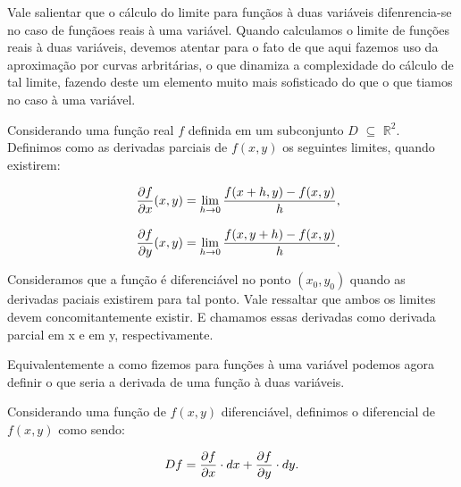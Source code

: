 \begin{definition}

    Vale salientar que o cálculo do limite para funçãos à duas variáveis
    difenrencia-se no caso de funçãoes reais à uma variável. Quando calculamos
    o limite de funções reais à duas variáveis, devemos atentar para o fato
    de que aqui fazemos uso da aproximação por curvas arbritárias, o que
    dinamiza a complexidade do cálculo de tal limite, fazendo deste um elemento
    muito mais sofisticado do que o que tiamos no caso à uma variável.

    Considerando uma função real $f$ definida em um subconjunto $D$ $\subseteq$ \(\mathbb{R}^2\). Definimos como as derivadas parciais de $f(x, y)$ os seguintes limites, quando existirem:

    \begin{equation}
        \begin{array}{ccc}
            &   \displaystyle {\frac{\partial f}{\partial x}(x, y) = \lim\limits_{h \to 0} \frac{f(x+h, y) - f(x, y)}{h},}\\
            &\\
            &   \displaystyle {\frac{\partial f}{\partial y}(x, y) = \lim\limits_{h \to 0} \frac{f(x,y+h) - f(x,y)}{h}.}\\
        \end{array}
    \end{equation}

\end{definition}

Consideramos que a função é diferenciável no ponto \( (x_0, y_0) \) quando as
derivadas paciais existirem para tal ponto. Vale ressaltar que ambos os limites
devem concomitantemente existir. E chamamos essas derivadas como derivada
parcial em x e em y, respectivamente.

Equivalentemente a como fizemos para funções à uma variável podemos agora
definir o que seria a derivada de uma função à duas variáveis.

\begin{definition}[Diferencial de $f(x, y)$]
    Considerando uma função de $f(x, y)$ diferenciável, definimos o diferencial
    de $f(x, y)$ como sendo:

    \begin{equation}
        Df = \frac{\partial f}{\partial x} \cdot dx + \frac{\partial f}{\partial y} \cdot dy.
    \end{equation}

\end{definition}

